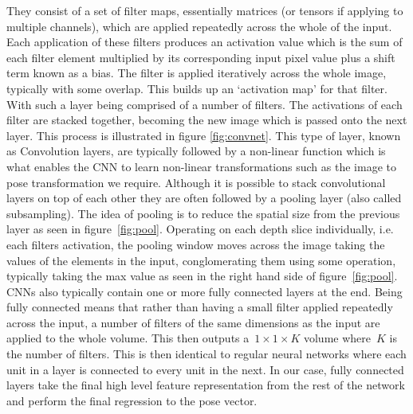 \documentclass[11pt]{article} %
\begin{document}
They consist of a set of filter maps, essentially matrices (or tensors if applying to multiple channels), which are applied repeatedly across the whole of the input. Each application of these filters produces an activation value which is the sum of each filter element multiplied by its corresponding input pixel value plus a shift term known as a bias. The filter is applied iteratively across the whole image, typically with some overlap. This builds up an `activation map' for that filter. With such a layer being comprised of a number of filters. The activations of each filter are stacked together, becoming the new image which is passed onto the next layer. This process is illustrated in figure \ref{fig:convnet}. This type of layer, known as Convolution layers, are typically followed by a non-linear function which is what enables the CNN to learn non-linear transformations such as the image to pose transformation we require. Although it is possible to stack convolutional layers on top of each other they are often followed by a pooling layer (also called subsampling). The idea of pooling is to reduce the spatial size from the previous layer as seen in figure~\ref{fig:pool}. Operating on each depth slice individually, i.e. each filters activation, the pooling window moves across the image taking the values of the elements in the input, conglomerating them using some operation, typically taking the max value as seen in the right hand side of figure~\ref{fig:pool}. CNNs also typically contain one or more fully connected layers at the end. Being fully connected means that rather than having a small filter applied repeatedly across the input, a number of filters of the same dimensions as the input are applied to the whole volume. This then outputs a~$1\times 1 \times K$ volume where~$K$ is the number of filters. This is then identical to regular neural networks where each unit in a layer is connected to every unit in the next. In our case, fully connected layers take the final high level feature representation from the rest of the network and perform the final regression to the pose vector. 
\end{document}
